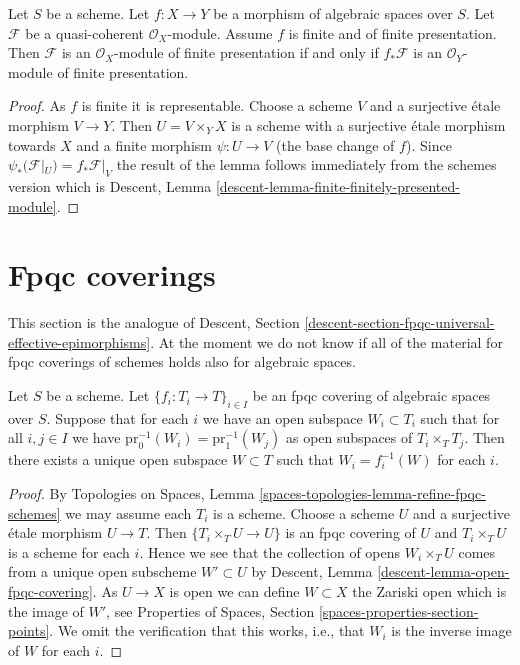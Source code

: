 \begin{lemma}
\label{lemma-finite-finitely-presented-module}
Let $S$ be a scheme.
Let $f : X \to Y$ be a morphism of algebraic spaces over $S$.
Let $\mathcal{F}$ be a quasi-coherent $\mathcal{O}_X$-module.
Assume $f$ is finite and of finite presentation.
Then $\mathcal{F}$ is an $\mathcal{O}_X$-module of finite presentation
if and only if $f_*\mathcal{F}$ is an $\mathcal{O}_Y$-module of finite
presentation.
\end{lemma}

\begin{proof}
As $f$ is finite it is representable. Choose a scheme $V$ and a surjective
\'etale morphism $V \to Y$. Then $U = V \times_Y X$ is a scheme with
a surjective \'etale morphism towards $X$ and a finite morphism
$\psi : U \to V$ (the base change of $f$). Since
$\psi_*(\mathcal{F}|_U) = f_*\mathcal{F}|_V$
the result of the lemma follows immediately from the schemes version which
is
Descent, Lemma \ref{descent-lemma-finite-finitely-presented-module}.
\end{proof}






\section{Fpqc coverings}
\label{section-fpqc}

\noindent
This section is the analogue of
Descent, Section \ref{descent-section-fpqc-universal-effective-epimorphisms}.
At the moment we do not know if all of the material for
fpqc coverings of schemes holds also for algebraic spaces.

\begin{lemma}
\label{lemma-open-fpqc-covering}
Let $S$ be a scheme.
Let $\{f_i : T_i \to T\}_{i \in I}$ be an fpqc covering
of algebraic spaces over $S$.
Suppose that for each $i$ we have an open subspace $W_i \subset T_i$
such that for all $i,j \in I$ we have
$\text{pr}_0^{-1}(W_i) = \text{pr}_1^{-1}(W_j)$ as open
subspaces of $T_i \times_T T_j$. Then there exists a unique open subspace
$W \subset T$ such that $W_i = f_i^{-1}(W)$ for each $i$.
\end{lemma}

\begin{proof}
By
Topologies on Spaces, Lemma \ref{spaces-topologies-lemma-refine-fpqc-schemes}
we may assume each $T_i$ is a scheme.
Choose a scheme $U$ and a surjective \'etale morphism $U \to T$.
Then $\{T_i \times_T U \to U\}$ is an fpqc covering of $U$
and $T_i \times_T U$ is a scheme for each $i$. Hence we
see that the collection of opens $W_i \times_T U$ comes from a unique
open subscheme $W' \subset U$ by
Descent, Lemma \ref{descent-lemma-open-fpqc-covering}.
As $U \to X$ is open we can define $W \subset X$ the Zariski
open which is the image of $W'$, see
Properties of Spaces, Section \ref{spaces-properties-section-points}.
We omit the verification that this works, i.e., that
$W_i$ is the inverse image of $W$ for each $i$.
\end{proof}

